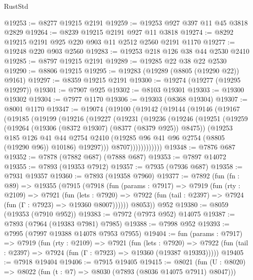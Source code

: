 \begin{lexlean}{RustStd}
\begin{coremodule}
@19253 := @8277 @19215 @2191
@19259 := @19253 @927 @397 @11 @45 @3818 @2829
@19264 := @8239 @19215 @2191 @927 @11 @3818
@19274 := @8292 @19215 @2191 @925 @220 @903 @11 @2512 @2560 @2191 @1170
@19277 := @19248 @220 @903 @2560
@19283 := @19253 @218 @126 @38 @44 @2530 @2410
@19285 := @8797 @19215 @2191
@19289 := @19285 @22 @38 @22 @2530
@19290 := @8806 @19215
@19295 := @19283 (@19289 (@8805 (@19290 @22)) @9161)
@19297 := @8359 @19215 @2191
@19300 := @19274 (@19277 (@19295 @19297))
@19301 := @7907 @925
@19302 := @8103 @19301
@19303 := @19300 @19302
@19304 := @7977 @1170
@19306 := @19303 (@8368 @19304)
@19307 := @8001 @1170
@19347 := @19074
    (@19100
      (@19142
        (@19144
          (@19146
            (@19167
              (@19185
                (@19199
                  (@19216
                    (@19227
                      (@19231
                        (@19236
                          (@19246
                            (@19251
                              (@19259
                                (@19264 (@19306 (@8372 @19307) (@8377 (@8379 @925)) @8475))
                                (@19253
                                  @185
                                  @126
                                  @41
                                  @44
                                  @2754
                                  @2410
                                  (@19285 @96 @41 @96 @2754 (@8805 (@19290 @96)) @10186)
                                  @19297)))
                            @8707))))))))))))
@19348 := @7876 @687
@19352 := @7878 (@7882 @687) (@7888 @687)
@19353 := @7897 @14072
@19355 := @7893 (@19353 @7912)
@19357 := @7935 (@7936 @687)
@19358 := @7931 @19357
@19360 := @7893 (@19358 @7960)
@19377 := @7892
    (fun (fn : @89) =>
    @19355
      (@7915
        (@7918
          (fun (params : @7917) =>
          @7919
            (fun (rty : @2109) =>
            @7921
              (fun (lets : @7920) =>
              @7922 (fun (tail : @2397) => @7924 (fun (Γ : @7923) => @19360 @8007))))))
        @8053))
    @952
@19380 := @8059 (@19353 (@7910 @952))
@19383 := @7972 (@7973 @952) @14075
@19387 := @7893 (@7964 (@19383 @7981) @7985)
@19388 := @7998 @952
@19393 := @7995 (@7997 @19388 @14078 @7953 @7955)
@19404 := fun (params : @7917) =>
  @7919
    (fun (rty : @2109) =>
    @7921
      (fun (lets : @7920) =>
      @7922 (fun (tail : @2397) => @7924 (fun (Γ : @7923) => @19360 (@19387 @19393)))))
@19405 := @7918 @19404
@19406 := @7915 @19405
@19415 := @8021
    (fun (U : @8020) => @8022 (fun (t : @7) => @8030 (@7893 (@8036 @14075 @7911) @8047)))

\end{coremodule}
\end{lexlean}
